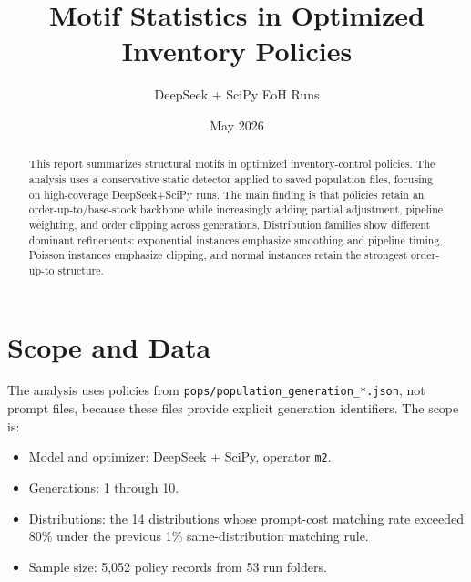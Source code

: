 \documentclass[11pt]{article}
\title{Motif Statistics in Optimized Inventory Policies}
\author{DeepSeek + SciPy EoH Runs}
\date{May 2026}
\begin{document}
\maketitle

\begin{abstract}
This report summarizes structural motifs in optimized inventory-control policies. The analysis uses a conservative static detector applied to saved population files, focusing on high-coverage DeepSeek+SciPy runs. The main finding is that policies retain an order-up-to/base-stock backbone while increasingly adding partial adjustment, pipeline weighting, and order clipping across generations. Distribution families show different dominant refinements: exponential instances emphasize smoothing and pipeline timing, Poisson instances emphasize clipping, and normal instances retain the strongest order-up-to structure.
\end{abstract}

\section{Scope and Data}
The analysis uses policies from \texttt{pops/population\_generation\_*.json}, not prompt files, because these files provide explicit generation identifiers. The scope is:
\begin{itemize}
  \item Model and optimizer: DeepSeek + SciPy, operator \texttt{m2}.
  \item Generations: 1 through 10.
  \item Distributions: the 14 distributions whose prompt-cost matching rate exceeded 80\% under the previous 1\% same-distribution matching rule.
  \item Sample size: 5,052 policy records from 53 run folders.
\end{itemize}
\end{document}
